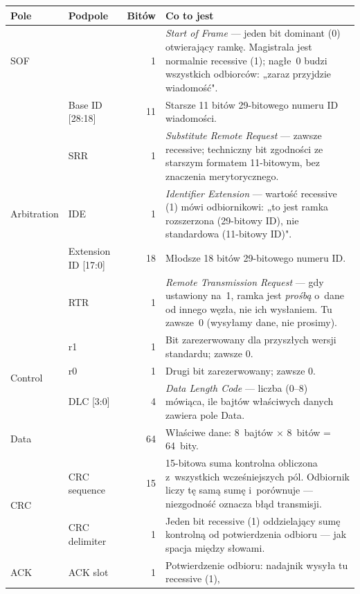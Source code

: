\documentclass[12pt,a4paper]{article}
\begin{document}
\begin{table}[H]
\centering
\small
\begin{tabular}{llrp{6.5cm}}
\toprule
\textbf{Pole} & \textbf{Podpole} & \textbf{Bitów} & \textbf{Co to jest} \\
\midrule
SOF & & 1 & \textit{Start of Frame} — jeden bit dominant (0) otwierający ramkę.
            Magistrala jest normalnie recessive (1); nagłe~0 budzi wszystkich
            odbiorców: „zaraz przyjdzie wiadomość". \\
\midrule
\multirow{5}{*}{Arbitration}
 & Base ID [28:18] & 11 & Starsze 11 bitów 29-bitowego numeru ID wiadomości. \\
 & SRR & 1 & \textit{Substitute Remote Request} — zawsze recessive; techniczny
             bit zgodności ze starszym formatem 11-bitowym, bez znaczenia
             merytorycznego. \\
 & IDE & 1 & \textit{Identifier Extension} — wartość recessive (1) mówi
             odbiornikowi: „to jest ramka rozszerzona (29-bitowy ID),
             nie standardowa (11-bitowy ID)". \\
 & Extension ID [17:0] & 18 & Młodsze 18 bitów 29-bitowego numeru ID. \\
 & RTR & 1 & \textit{Remote Transmission Request} — gdy ustawiony na~1,
             ramka jest \emph{prośbą} o~dane od innego węzła, nie ich
             wysłaniem. Tu zawsze~0 (wysyłamy dane, nie prosimy). \\
\midrule
\multirow{3}{*}{Control}
 & r1 & 1 & Bit zarezerwowany dla przyszłych wersji standardu; zawsze 0. \\
 & r0 & 1 & Drugi bit zarezerwowany; zawsze 0. \\
 & DLC [3:0] & 4 & \textit{Data Length Code} — liczba (0–8) mówiąca,
                    ile bajtów właściwych danych zawiera pole Data. \\
\midrule
Data & & 64 & Właściwe dane: 8~bajtów $\times$ 8~bitów = 64~bity. \\
\midrule
\multirow{2}{*}{CRC}
 & CRC sequence & 15 & 15-bitowa suma kontrolna obliczona z~wszystkich
                       wcześniejszych pól. Odbiornik liczy tę samą sumę
                       i~porównuje — niezgodność oznacza błąd transmisji. \\
 & CRC delimiter & 1 & Jeden bit recessive (1) oddzielający sumę kontrolną
                       od potwierdzenia odbioru — jak spacja między słowami. \\
\midrule
\multirow{2}{*}{ACK}
 & ACK slot & 1 & Potwierdzenie odbioru: nadajnik wysyła tu recessive (1),

\end{tabular}
\end{table}
\end{document}
